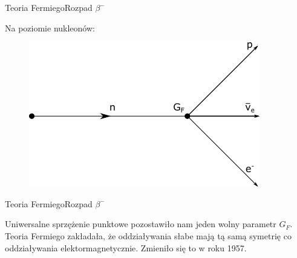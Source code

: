 \documentclass{beamer}
\begin{document}
\begin{frame}{Teoria Fermiego}{Rozpad $\beta^-$}

    Na poziomie nukleonów:

    \begin{figure}

        \includegraphics{4pointsnuc.png}

    \end{figure}

\end{frame}

\begin{frame}{Teoria Fermiego}{Rozpad $\beta^-$}

Uniwersalne sprzężenie punktowe pozostawiło nam jeden wolny parametr $G_F$. Teoria Fermiego zakładała, że oddziaływania słabe mają tą samą symetrię co oddziaływania elektormagnetycznie. Zmieniło się to w roku 1957.

\end{frame}
\end{document}
